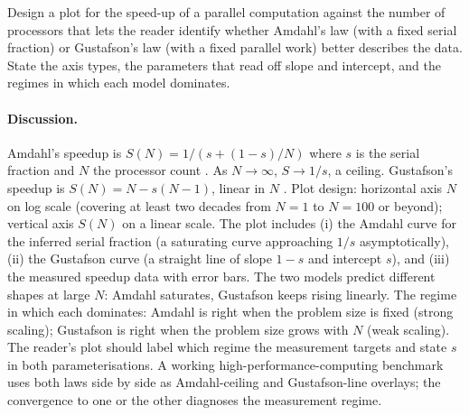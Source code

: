 \begin{exercise}
Design a plot for the speed-up of a parallel computation against the
number of processors that lets the reader identify whether Amdahl's
law (with a fixed serial fraction) or Gustafson's law (with a fixed
parallel work) better describes the data. State the axis types,
the parameters that read off slope and intercept, and the regimes in
which each model dominates.

\paragraph{Discussion.}
Amdahl's speedup is $S(N) = 1/(s + (1 - s)/N)$ where $s$ is the
serial fraction and $N$ the processor count
\cite{v2c02-paper:amdahl1967}. As $N \to \infty$, $S \to 1/s$, a
ceiling. Gustafson's speedup is $S(N) = N - s(N - 1)$, linear in
$N$ \cite{v2c02-paper:gustafson1988}.
Plot design: horizontal axis $N$ on log scale (covering at least
two decades from $N = 1$ to $N = 100$ or beyond); vertical axis
$S(N)$ on a linear scale. The plot includes (i) the Amdahl curve
for the inferred serial fraction (a saturating curve approaching
$1/s$ asymptotically), (ii) the Gustafson curve (a straight line
of slope $1 - s$ and intercept $s$), and (iii) the measured speedup
data with error bars. The two models predict different shapes at
large $N$: Amdahl saturates, Gustafson keeps rising linearly. The
regime in which each dominates: Amdahl is right when the problem
size is fixed (strong scaling); Gustafson is right when the problem
size grows with $N$ (weak scaling). The reader's plot should label
which regime the measurement targets and state $s$ in both
parameterisations. A working high-performance-computing benchmark
uses both laws side by side as Amdahl-ceiling and Gustafson-line
overlays; the convergence to one or the other diagnoses the
measurement regime.
\end{exercise}

